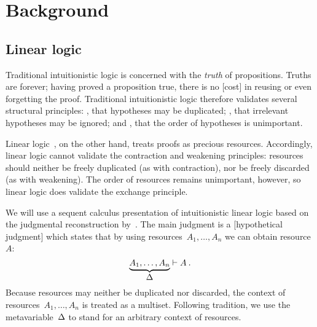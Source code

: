 \section{Background}\label{sec:background}

\subsection{Linear logic}\label{sec:linear-logic}

Traditional intuitionistic logic is concerned with the \emph{truth} of propositions.
Truths are forever;
having proved a proposition true, there is no [cost] in reusing or even forgetting the proof.
Traditional intuitionistic logic therefore validates several structural principles: , that hypotheses may be duplicated; , that irrelevant hypotheses may be ignored; and , that the order of hypotheses is unimportant.

Linear logic~\autocite{Girard:TCS87}, on the other hand, treats proofs as precious resources.
Accordingly, linear logic cannot validate the contraction and weakening principles: resources should neither be freely duplicated (as with contraction), nor be freely discarded (as with weakening).
The order of resources remains unimportant, however, so linear logic does validate the exchange principle.

We will use a sequent calculus presentation of intuitionistic linear logic based on the judgmental reconstruction by~\textcite{Chang+:CMU03}.
The main judgment is a [hypothetical judgment] which states that by using resources~$A_1, \dotsc, A_n$ we can obtain resource~$A$:%
\begin{equation*}
  \underbrace{A_1, \dotsc, A_n}_{\textstyle \Delta} \vdash A \:.
\end{equation*}
Because resources may neither be duplicated nor discarded, the context of resources~$A_1, \dotsc, A_n$ is treated as a multiset.
%
Following tradition, we use the metavariable~$\Delta$ to stand for an arbitrary context of resources.

